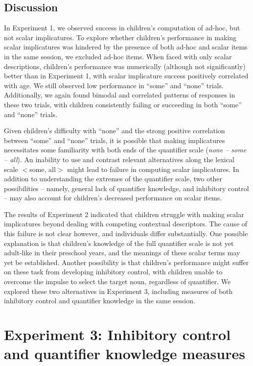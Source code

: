 \documentclass[man]{apa2}
\begin{document}
\subsection{Discussion}

In Experiment 1, we observed success in children's computation of ad-hoc, but not scalar implicatures. To explore whether children's performance in making scalar implicatures was hindered by the presence of both ad-hoc and scalar items in the same session, we excluded ad-hoc items. When faced with only scalar descriptions, children's performance was numerically (although not significantly) better than in Experiment 1, with scalar implicature success positively correlated with age. We still observed low performance in ``some'' and ``none'' trials. Additionally, we again found bimodal and correlated patterns of responses in these two trials, with children consistently failing or succeeding in both ``some'' and ``none'' trials. 

Given children's difficulty with ``none'' and the strong positive correlation between ``some'' and ``none'' trials, it is possible that making implicatures necessitates some familiarity with both ends of the quantifier scale (\textit{none -- some -- all}). An inability to use and contrast relevant alternatives along the lexical scale $<${\sc some, all}$>$ might lead to failure in computing scalar implicatures. In addition to understanding the extremes of the quantifier scale, two other possibilities -- namely, general lack of quantifier knowledge, and inhibitory control -- may also account for children's decreased performance on scalar items. 

The results of Experiment 2 indicated that children struggle with making scalar implicatures beyond dealing with competing contextual descriptors. The cause of this failure is not clear however, and individuals differ substantially. One possible explanation is that children's knowledge of the full quantifier scale is not yet adult-like in their preschool years, and the meanings of these scalar terms may yet be established. Another possibility is that children's performance might suffer on these task from developing inhibitory control, with children unable to overcome the impulse to select the target noun, regardless of quantifier. We explored these two alternatives in Experiment 3, including measures of both inhibitory control and quantifier knowledge in the same session. 
				
\section{Experiment 3: Inhibitory control and quantifier knowledge measures}
\end{document}
